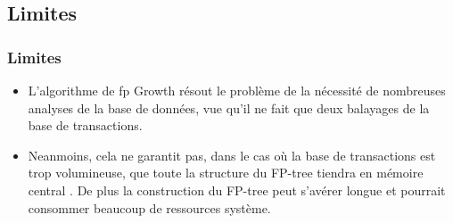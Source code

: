 \documentclass{beamer}
\begin{document}
\subsection[Limites]{Limites}
\frame
{
  \frametitle{Limites}
   \begin{itemize}
  \item<1-> L'algorithme de \acrfull{fp} Growth résout le problème de la nécessité de nombreuses analyses de la base de données, vue qu'il ne fait que deux balayages de la base de transactions. \cite{towardsdatascience}
  \item<1-> Neanmoins, cela ne garantit pas, dans le cas où la base de transactions est trop volumineuse, que toute la structure du FP-tree tiendra en mémoire central \cite{softwaretestinghelp}. De plus la construction du FP-tree peut s'avérer longue et pourrait consommer beaucoup de ressources système.\cite{mygreatlearning}
  \end{itemize}

}

\end{document}
